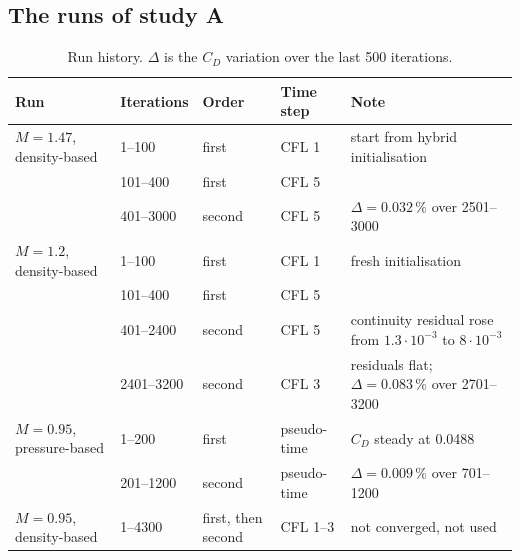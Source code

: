 
\subsection{The runs of study A}

\begin{table}[H]
\centering
\caption{Run history. $\Delta$ is the $C_D$ variation over the last 500 iterations.}
\label{tab:runs}
\small
\begin{tabularx}{\linewidth}{@{}llll>{\raggedright\arraybackslash}X@{}}
\toprule
Run & Iterations & Order & Time step & Note \\
\midrule
$M = 1.47$, density-based & 1--100 & first & CFL 1 & start from hybrid initialisation \\
 & 101--400 & first & CFL 5 & \\
 & 401--3000 & second & CFL 5 & $\Delta = 0.032\,\%$ over 2501--3000 \\
\midrule
$M = 1.2$, density-based & 1--100 & first & CFL 1 & fresh initialisation \\
 & 101--400 & first & CFL 5 & \\
 & 401--2400 & second & CFL 5 & continuity residual rose from $1.3\cdot10^{-3}$ to $8\cdot10^{-3}$ \\
 & 2401--3200 & second & CFL 3 & residuals flat; $\Delta = 0.083\,\%$ over 2701--3200 \\
\midrule
$M = 0.95$, pressure-based & 1--200 & first & pseudo-time & $C_D$ steady at 0.0488 \\
 & 201--1200 & second & pseudo-time & $\Delta = 0.009\,\%$ over 701--1200 \\
\midrule
$M = 0.95$, density-based & 1--4300 & first, then second & CFL 1--3 & not converged, not used \\
\bottomrule
\end{tabularx}
\end{table}

